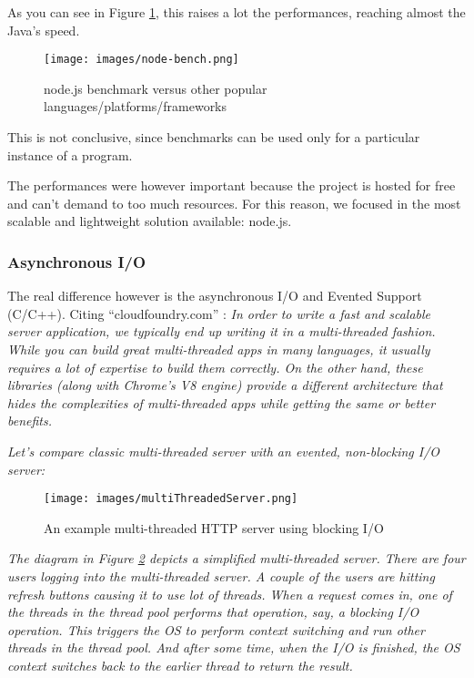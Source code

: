 As you can see in Figure \ref{fig:nodeBench}, this raises a lot the performances, reaching almost the Java's speed.

\begin{figure}[H]
\centering %
\texttt{[image: images/node-bench.png]}
\caption{node.js benchmark versus other popular languages/platforms/frameworks}
\label{fig:nodeBench}
\end{figure}

This is not conclusive, since benchmarks can be used only for a particular instance of a program.

The performances were however important because the project is hosted for free and can't demand to too much resources. For this reason, we focused in the most scalable and lightweight solution available: node.js.

\subsubsection{Asynchronous I/O}
\label{sec:async}

The real difference however is the asynchronous I/O and Evented Support (C/C++). Citing ``cloudfoundry.com'' \cite{website:cloudfoundry}: \textit{In order to write a fast and scalable server application, we typically end up writing it in a multi-threaded fashion. While you can build great multi-threaded apps in many languages, it usually requires a lot of expertise to build them correctly. On the other hand, these libraries (along with Chrome’s V8 engine) provide a different architecture that hides the complexities of multi-threaded apps while getting the same or better benefits.}

\textit{Let's compare classic multi-threaded server with an evented, non-blocking I/O server:}

\begin{figure}[H]
\centering %
\texttt{[image: images/multiThreadedServer.png]}
\caption{An example multi-threaded HTTP server using blocking I/O}
\label{fig:multiThreadedServer}
\end{figure}

\textit{The diagram in Figure \ref{fig:multiThreadedServer} depicts a simplified multi-threaded server. There are four users logging into the multi-threaded server. A couple of the users are hitting refresh buttons causing it to use lot of threads. When a request comes in, one of the threads in the thread pool performs that operation, say, a blocking I/O operation. This triggers the OS to perform context switching and run other threads in the thread pool. And after some time, when the I/O is finished, the OS context switches back to the earlier thread to return the result.}

